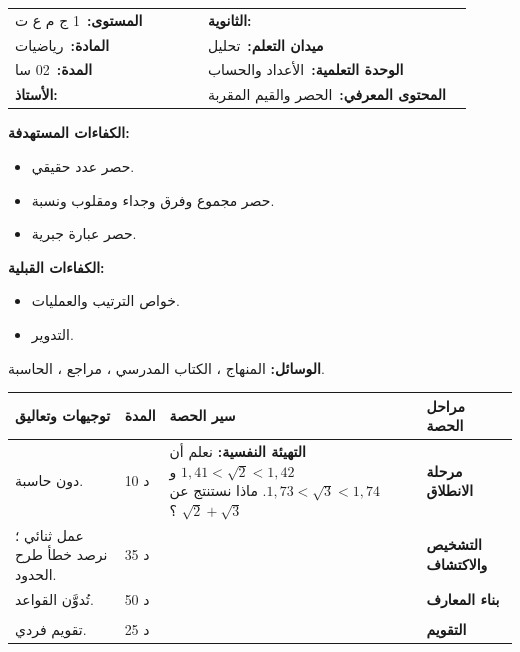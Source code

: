 \documentclass[12pt,a4paper]{article}
\makeatletter
\newenvironment{LTR}{\begin{otherlanguage}{english}}{\end{otherlanguage}}
\newcommand{\ar}[1]{\foreignlanguage{arabic}{#1}}
\newcommand{\Phase}[1]{\textbf{#1}}
\newcommand{\Fld}[2]{\textbf{#1:}\ #2}
\newcommand{\ModhHead}[9]{%
\begin{LTR}
\begin{tcolorbox}[enhanced,colback=white,colframe=cThm!85!black,arc=4mm,boxrule=1pt,top=14pt,bottom=6pt,left=8pt,right=8pt,
 overlay={\node[fill=cThm!85!black,text=white,rounded corners=3mm,inner xsep=14pt,inner ysep=4pt,font=\large\bfseries] at ([yshift=0pt]frame.north){\ar{مذكرة رقم #1}};},
 before upper={\selectlanguage{arabic}}]
\begin{tabular}{@{}p{0.4\linewidth}p{0.55\linewidth}@{}}
\Fld{المستوى}{#2} & \Fld{الثانوية}{\dotfill}\\[3pt]
\Fld{المادة}{رياضيات} & \Fld{ميدان التعلم}{#3}\\[3pt]
\Fld{المدة}{#5} & \Fld{الوحدة التعلمية}{#4}\\[3pt]
\Fld{الأستاذ}{\dotfill} & \Fld{المحتوى المعرفي}{#6}\\
\end{tabular}
\end{tcolorbox}
\begin{tcolorbox}[enhanced,colback=white,colframe=cThm!85!black,arc=3mm,boxrule=0.8pt,sidebyside,sidebyside align=top,lefthand ratio=0.5,
 segmentation style={dashed,cThm!60},before upper={\selectlanguage{arabic}},before lower={\selectlanguage{arabic}}]
\textbf{الكفاءات المستهدفة:}\par #8
\tcblower
\textbf{الكفاءات القبلية:}\par #7
\end{tcolorbox}
\end{LTR}
\par\smallskip\textbf{الوسائل:} #9\par\smallskip}
\newenvironment{Sayr}{%
\begin{LTR}\renewcommand{\arraystretch}{1.25}
\begin{longtable}{|p{0.17\textwidth}|>{\centering\arraybackslash}p{0.06\textwidth}|p{0.53\textwidth}|>{\centering\arraybackslash}p{0.12\textwidth}|}
\hline\rowcolor{cThm!12}\ar{\textbf{توجيهات وتعاليق}} & \ar{\textbf{المدة}} & \ar{\textbf{سير الحصة}} & \ar{\textbf{مراحل الحصة}}\\\hline\endhead
\hline\endfoot}{\end{longtable}\end{LTR}}
\newcommand{\Row}[4]{\ar{\small #4} & \ar{#3} & \ar{#2} & \cellcolor{cThm!8}\ar{\Phase{#1}}\\\hline}
\newcommand{\Lab}[2]{\foreignlanguage{english}{\tcbox[on line,colback=#1,colframe=#1,boxrule=0pt,arc=2pt,boxsep=1pt,left=5pt,right=5pt,top=1pt,bottom=1pt]{\ar{\textcolor{white}{\textbf{#2}}}}}}
\newcommand{\ck}{\ensuremath{{\color{cRem}\checkmark}}}
\makeatother
\begin{document}
\newpage
\ModhHead{08}{1 ج م ع ت}{تحليل}{الأعداد والحساب}{02 سا}{الحصر والقيم المقربة}%
{\begin{itemize}\item خواص الترتيب والعمليات.\item التدوير.\end{itemize}}%
{\begin{itemize}\item حصر عدد حقيقي.\item حصر مجموع وفرق وجداء ومقلوب ونسبة.\item حصر عبارة جبرية.\end{itemize}}%
{المنهاج ، الكتاب المدرسي ، مراجع ، الحاسبة.}
\begin{Sayr}
\Row{مرحلة الانطلاق}{%
\textbf{التهيئة النفسية:} نعلم أن $1{,}41<\sqrt2<1{,}42$ و $1{,}73<\sqrt3<1{,}74$. ماذا نستنتج عن $\sqrt2+\sqrt3$ ؟}{10 د}{دون حاسبة.}
\Row{التشخيص والاكتشاف}{%
\Lab{cEx}{مناقشة نشاط 03 صفحة 25}\par\ck\ $3{,}14<\sqrt2+\sqrt3<3{,}16$: نجمع الحدود طرفاً بطرف.\par
\ck\ $-1{,}42<-\sqrt2<-1{,}41$ ، إذن $0{,}31<\sqrt3-\sqrt2<0{,}33$.\par
\ck\ $2{,}4393<\sqrt6<2{,}4708$: نضرب حدوداً موجبة.\par
\ck\ $\dfrac{1}{1{,}42}<\dfrac{1}{\sqrt2}<\dfrac1{1{,}41}$ ، أي $0{,}704<\dfrac1{\sqrt2}<0{,}710$.\par
}{35 د}{عمل ثنائي ؛ نرصد خطأ طرح الحدود.}
\Row{بناء المعارف}{%
\Lab{cThm}{خاصية}\ إذا كان $a<x<b$ و $c<y<d$:\par\ck\ $a+c<x+y<b+d$ ؛ $a-d<x-y<b-c$.\par
\ck\ إذا كانت الحدود موجبة: $ac<xy<bd$ ؛ $\dfrac1b<\dfrac1x<\dfrac1a$ ؛ $\dfrac ad<\dfrac xy<\dfrac bc$.\par
\Lab{cDef}{سعة الحصر}\ العدد $b-a$ ، وكلما صغرت كان الحصر أدق.\par}{50 د}{تُدوَّن القواعد.}
\Row{}{%
\Lab{cEx}{حصر عبارة}\ إذا كان $x\in[1;2]$: $2x-3\in[-1;1]$ ؛ $x^2\in[1;4]$ ؛ $\dfrac{1}{x+1}\in\Big[\dfrac13;\dfrac12\Big]$.\par\Lab{cThm!80!black}{حذار}\ لا نطرح الحدود ولا نقسمها مباشرة.}{}{}
\Row{التقويم}{%
\Lab{cEx}{تطبيق}\par $2<x<3$ و $1<y<2$. احصر $x+y$ ، $x-y$ ، $xy$ ، $\dfrac xy$.\par\textbf{الحل:} $3<x+y<5$ ؛ $0<x-y<2$ ؛ $2<xy<6$ ؛ $1<\dfrac xy<3$.\par\textbf{واجب منزلي:} تمارين من الكتاب المدرسي.\par\smallskip\textbf{ملاحظات حول سير الحصة:} \dotfill}{25 د}{تقويم فردي.}
\end{Sayr}
\end{document}
